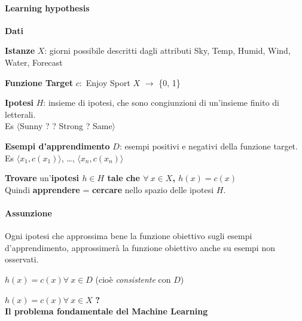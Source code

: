 \documentclass[10pt]{book}
\begin{document}
\paragraph{Learning hypothesis} \textbf{Dati}
\begin{list}{}{}
	\item \textbf{Istanze} $X$: giorni possibile descritti dagli attributi Sky, Temp, Humid, Wind, Water, Forecast
	\item \textbf{Funzione Target} $c : $ Enjoy Sport $X$ $\rightarrow$ \{0, 1\}
	\item \textbf{Ipotesi} $H$: insieme di ipotesi, che sono congiunzioni di un'insieme finito di letterali.\\Es $\langle$Sunny ? ? Strong ? Same$\rangle$
	\item \textbf{Esempi d'apprendimento} $D$: esempi positivi e negativi della funzione target.\\Es $\langle x_1, c(x_1)\rangle$, \ldots, $\langle x_n, c(x_n)\rangle$
\end{list}
\textbf{Trovare} un'\textbf{ipotesi $h \in H$ tale che $\forall\: x \in X$, $h(x) = c(x)$}\\
Quindi \textbf{apprendere} = \textbf{cercare} nello spazio delle ipotesi $H$.
\paragraph{Assunzione} Ogni ipotesi che approssima bene la funzione obiettivo sugli esempi d'apprendimento, approssimerà la funzione obiettivo anche su esempi non osservati.
\begin{list}{}{}
	\item $h(x) = c(x) \forall\: x \in D$ (cioè \textit{consistente} con $D$)
	\item $h(x) = c(x) \forall\: x \in X$ \textbf{?}\\
	\textbf{Il problema fondamentale del Machine Learning}
\end{list}
\pagebreak
\end{document}
